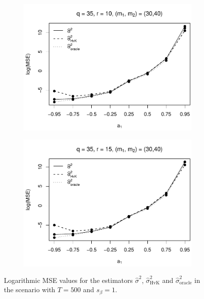 \begin{figure}[p]
\begin{subfigure}[b]{0.45\textwidth}
\includegraphics[width=\textwidth]{Plots/Robustness/MSE_lrv_T=500_slope=1_(q,K1,K2,M1,M2)=(35,2,10,30,40).pdf}
\end{subfigure}
\hspace{0.25cm}
\begin{subfigure}[b]{0.45\textwidth}
\includegraphics[width=\textwidth]{Plots/Robustness/MSE_lrv_T=500_slope=1_(q,K1,K2,M1,M2)=(35,2,15,30,40).pdf}
\end{subfigure}
\caption{Logarithmic MSE values for the estimators $\widehat{\sigma}^2$, $\widehat{\sigma}^2_{\text{HvK}}$ and $\widehat{\sigma}^2_{\text{oracle}}$ in the scenario with $T=500$ and $s_\beta=1$.}\label{fig:MSE_slope1_lrv_robust}
\end{figure}


